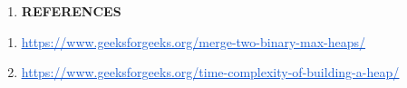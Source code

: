 \begin{multicols}{2}
\begin{enumerate}
\vspace{\baselineskip}
	\item \textbf{ REFERENCES}
\end{enumerate}\par

\begin{enumerate}
	\item \href{https://www.geeksforgeeks.org/merge-two-binary-max-heaps/}{\textcolor[HTML]{1155CC}{\ul{https://www.geeksforgeeks.org/merge-two-binary-max-heaps/}}}\par

	\item \href{https://www.geeksforgeeks.org/time-complexity-of-building-a-heap/}{\textcolor[HTML]{1155CC}{\ul{https://www.geeksforgeeks.org/time-complexity-of-building-a-heap/}}}
\end{enumerate}\par


\vspace{\baselineskip}

\vspace{\baselineskip}

\vspace{\baselineskip}
\tab 
\vspace{\baselineskip}
\vspace{\baselineskip}

\vspace{\baselineskip}

\vspace{\baselineskip}

\vspace{\baselineskip}

\vspace{\baselineskip}

\vspace{\baselineskip}

\vspace{\baselineskip}

\vspace{\baselineskip}

\vspace{\baselineskip}

\vspace{\baselineskip}

\vspace{\baselineskip}

\vspace{\baselineskip}

\end{multicols}

\printbibliography

